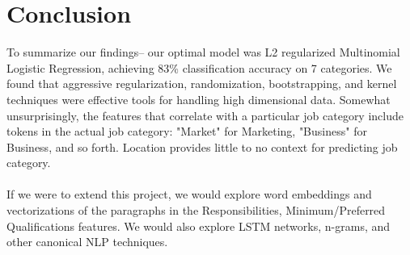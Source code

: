\documentclass[9.5 pt]{article}
\begin{document}

\section{Conclusion }
To summarize our findings-- our optimal model was L2 regularized Multinomial Logistic Regression, achieving 83\% classification accuracy on 7 categories. We found that aggressive regularization, randomization, bootstrapping, and kernel techniques were effective tools for handling high dimensional data. Somewhat unsurprisingly, the features that correlate with a particular job category include tokens in the actual job category: "Market" for Marketing, "Business" for Business, and so forth. Location provides little to no context for predicting job category. \\ \\
If we were to extend this project, we would explore word embeddings and vectorizations of the paragraphs in the Responsibilities, Minimum/Preferred Qualifications features. We would also explore LSTM networks, n-grams, and other canonical NLP techniques.
\end{document}

